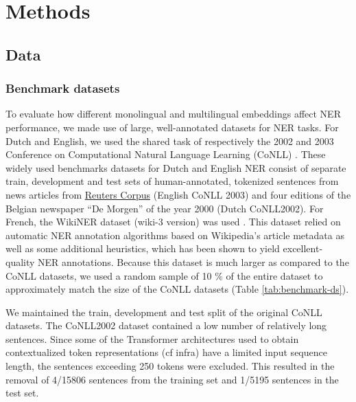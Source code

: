 \documentclass[12pt,a4paper,]{book}
\begin{document}
\hypertarget{methods}{%
\chapter{Methods}\label{methods}}

\hypertarget{data}{%
\section{Data}\label{data}}

\hypertarget{benchmark-datasets}{%
\subsection{Benchmark datasets}\label{benchmark-datasets}}

To evaluate how different monolingual and multilingual embeddings affect NER performance, we made use of large, well-annotated datasets for NER tasks. For Dutch and English, we used the shared task of respectively the 2002 and 2003 Conference on Computational Natural Language Learning (CoNLL) \citep{tjongkimsang2002, tjongkimsang2003}. These widely used benchmarks datasets for Dutch and English NER consist of separate train, development and test sets of human-annotated, tokenized sentences from news articles from \href{https://trec.nist.gov/data/reuters/reuters.html}{Reuters Corpus} (English CoNLL 2003) and four editions of the Belgian newspaper ``De Morgen'' of the year 2000 (Dutch CoNLL2002). For French, the WikiNER dataset (wiki-3 version) was used \citep{nothman2013}. This dataset relied on automatic NER annotation algorithms based on Wikipedia's article metadata as well as some additional heuristics, which has been shown to yield excellent-quality NER annotations. Because this dataset is much larger as compared to the CoNLL datasets, we used a random sample of 10 \% of the entire dataset to approximately match the size of the CoNLL datasets (Table \ref{tab:benchmark-ds}).

We maintained the train, development and test split of the original CoNLL datasets. The CoNLL2002 dataset contained a low number of relatively long sentences. Since some of the Transformer architectures used to obtain contextualized token representations (cf infra) have a limited input sequence length, the sentences exceeding 250 tokens were excluded. This resulted in the removal of 4/15806 sentences from the training set and 1/5195 sentences in the test set.
\end{document}
